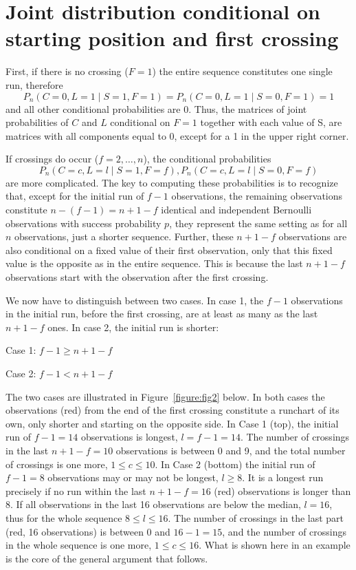 \section{Joint distribution conditional on starting position and first crossing}

First, if there is no crossing ($F=1$) the entire sequence constitutes one single run, therefore $$P_n (C=0,L=1 \mid S=1,F=1)=P_n (C=0,L=1 \mid S=0,F=1)=1$$ and all other conditional probabilities are 0. Thus, the matrices of joint probabilities of $C$ and $L$ conditional on $F=1$ together with each value of S, are matrices with all components equal to 0, except for a 1 in the upper right corner.

If crossings do occur ($f=2, \ldots ,n$), the conditional probabilities $$P_n (C=c,L=l \mid S=1,F=f), P_n (C=c,L=l \mid S=0,F=f)$$ are more complicated. The key to computing these probabilities is to recognize that, except for the initial run of $f-1$ observations, the remaining observations constitute $n-(f-1)=n+1-f$ identical and independent Bernoulli observations with success probability $p$, they represent the same setting as for all $n$ observations, just a shorter sequence. Further, these $n+1-f$ observations are also conditional on a fixed value of their first observation, only that this fixed value is the opposite as in the entire sequence. This is because the last $n+1-f$ observations start with the  observation after the first crossing. 

We now have to distinguish between two cases. In case 1, the $f-1$ observations in the initial run,  before the first crossing, are at least as many as the last $n+1-f$ ones. In case 2, the initial run is shorter:

Case 1: $f-1 \geq n+1-f$

Case 2: $f-1<n+1-f$

The two cases are illustrated in Figure~\ref{figure:fig2} below. In both cases the observations (red) from the end of the first crossing constitute a runchart of its own, only shorter and starting on the opposite side. In Case 1 (top), the initial run of $f-1=14$ observations is longest, $l=f-1=14$. The number of crossings in the last $n+1-f=10$ observations is between 0 and 9, and the total number of crossings is one more, $1 \leq c \leq 10$. In Case 2 (bottom) the initial run of $f-1=8$ observations may or may not be longest, $l \geq 8$. It is a longest run precisely if no run within the last $n+1-f=16$ (red) observations is longer than 8. If all observations in the last 16 observations are below the median, $l=16$, thus for the whole sequence $8 \leq l \leq 16$. The number of crossings in the last part (red, 16 observations) is between 0 and $16-1=15$, and the number of crossings in the whole sequence is one more, $1 \leq c \leq 16$. What is shown here in an example is the core of the general argument that follows.


